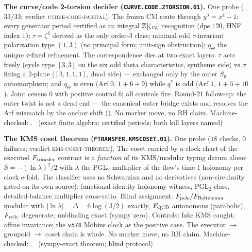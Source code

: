 \par\smallskip\noindent\textbf{The curve/code 2-torsion decider
(\texttt{CURVE.CODE.2TORSION.01}).}
One probe ($33/33$; verdict \textsc{curve-code-partial}).  The
frozen CM route through $y^3=x^4-1$: every generator period
certified as an integral $\mathbb{Z}[\zeta_{12}]$ recognition (dps $120$,
HNF index $1$); $\tau=\zeta^4$ derived as the only order-3 class;
minimal odd $\tau$-invariant polarization type $(1,3)$ (no
principal form; unit-sign obstruction); $q_\Theta$ the unique
$\tau$-fixed refinement.  The correspondence dies at two exact
layers: $\tau$ acts freely (cycle type $[3,3]$ on the six odd theta
characteristics, syntheme side) vs $\bar\sigma$ fixing a 2-plane
($[3,1,1,1]$, duad side) --- exchanged only by the outer $S_6$
automorphism; and $q_\Theta$ is even (Arf $0$, $1{+}6{+}9$) while
$q^{*}$ is odd (Arf $1$, $1{+}5{+}10$).  Joint census $0$ with
positive control $6$; all controls fire.  Round-21 follow-up: the
outer twist is not a dead end --- the canonical outer bridge
exists and resolves the Arf mismatch by the anchor shift
().  No marker move, no RH
claim.
Machine-checked: .
\mE\ (exact finite algebra; certified periods; both kill layers
named)
\par\smallskip

\par\smallskip\noindent\textbf{The KMS coset theorem
(\texttt{FTRANSFER.KMSCOSET.01}).}
One probe ($18$ checks, $0$ failures; verdict
\textsc{kms-coset-theorem}).  The coset carried by a clock chart of
the executed $F_{\rm transfer}$ contract is a \emph{function} of its
KMS/modular typing datum alone: $S=-(\ln\lambda)^2/2$ with $\lambda$
the PGL$_2$ multiplier of the flow's time-1 holonomy per clock
e-fold.  The classifier uses no Schwarzian and no derivatives
(non-circularity gated on its own source): functional-identity
holonomy witness, PGL$_2$ class, detailed-balance multiplier
cross-ratio.  Blind assignment: $F_{\rm pole}/F_{\rm Boltzmann}$
modular with $|\ln\lambda|=\Delta=6\log(3/2)$ exactly, $F_{\rm QCD}$
autonomous (parabolic), $F_{\rm relic}$ degenerate; unblinding exact
(sympy zero).  Controls: fake KMS caught; affine invariance; the
\texttt{v578} M\"obius clock as the positive case.  The
executor $\to$ groupoid $\to$ coset chain is whole.  No marker move,
no RH claim.
Machine-checked: .
\mE\ (sympy-exact theorem; blind protocol)
\par\smallskip

